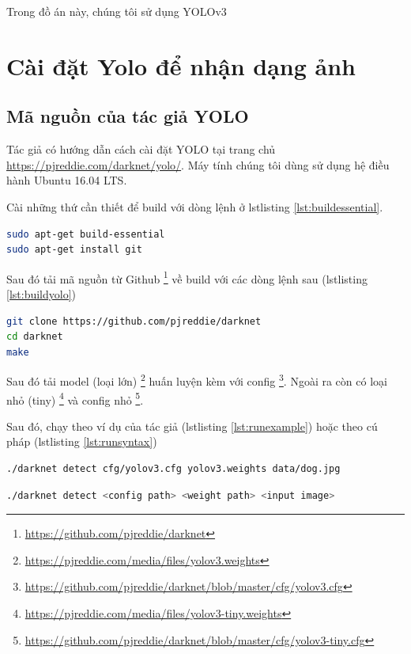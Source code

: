Trong đồ án này, chúng tôi sử dụng YOLOv3 

\section{Cài đặt Yolo để nhận dạng ảnh}

\subsection{Mã nguồn của tác giả YOLO}

Tác giả có hướng dẫn cách cài đặt YOLO tại trang chủ  \url{https://pjreddie.com/darknet/yolo/}. Máy tính chúng tôi dùng sử dụng hệ điều hành Ubuntu 16.04 LTS. 

Cài những thứ cần thiết để build với dòng lệnh ở lstlisting \ref{lst:buildessential}.

\begin{lstlisting}[caption={Cài những gói cần thiết để build}, label={lst:buildessential}, language=bash]
sudo apt-get build-essential
sudo apt-get install git
\end{lstlisting}

Sau đó tải mã nguồn từ Github \footnote{\url{https://github.com/pjreddie/darknet}} về build với các dòng lệnh sau (lstlisting \ref{lst:buildyolo})


\begin{lstlisting}[caption={Tải và build mã nguồn}, label={lst:buildyolo}, language=bash]
git clone https://github.com/pjreddie/darknet   
cd darknet 
make  
\end{lstlisting}

Sau đó tải model (loại lớn) \footnote{\url{https://pjreddie.com/media/files/yolov3.weights}}  huấn luyện kèm với config \footnote{\url{https://github.com/pjreddie/darknet/blob/master/cfg/yolov3.cfg}}. Ngoài ra còn có loại nhỏ (tiny) \footnote{\url{https://pjreddie.com/media/files/yolov3-tiny.weights}} và config nhỏ \footnote{\url{https://github.com/pjreddie/darknet/blob/master/cfg/yolov3-tiny.cfg}}. 

Sau đó, chạy theo ví dụ của tác giả (lstlisting \ref{lst:runexample}) hoặc theo cú pháp (lstlisting \ref{lst:runsyntax})

\begin{lstlisting}[caption={ví dụ chạy nhận diện vật thể}, label={lst:runexample}, language=bash]
./darknet detect cfg/yolov3.cfg yolov3.weights data/dog.jpg
\end{lstlisting}


\begin{lstlisting}[caption={ví dụ chạy nhận diện vật thể}, label={lst:runsyntax}, language=bash]
./darknet detect <config path> <weight path> <input image>
\end{lstlisting}



